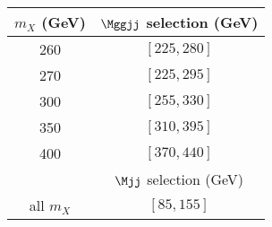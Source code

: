 \begin{tabular}{   c | c   }
\hline
$m_X$ (GeV) & $\Mggjj$ selection (GeV) \\        \hline
260  & $[225,280]$  \\
270  & $[225,295]$  \\
300  & $[255,330]$  \\
350  & $[310,395]$  \\
400  & $[370,440]$  \\
& $\Mjj$ selection (GeV)\\ \hline
all $m_{X}$ & $[85,155]$ \\ \hline
\end{tabular}
